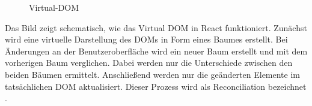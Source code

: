 \begin{figure}[htbp]
	\centering
	\caption{Virtual-DOM}
\end{figure}

Das Bild zeigt schematisch, wie das Virtual DOM in React funktioniert. Zunächst wird eine virtuelle Darstellung des DOMs in Form eines Baumes erstellt. Bei Änderungen an der Benutzeroberfläche wird ein neuer Baum erstellt und mit dem vorherigen Baum verglichen. Dabei werden nur die Unterschiede zwischen den beiden Bäumen ermittelt. Anschließend werden nur die geänderten Elemente im tatsächlichen DOM aktualisiert. Dieser Prozess wird als Reconciliation bezeichnet \cite{ReactVirtualDOM}.

